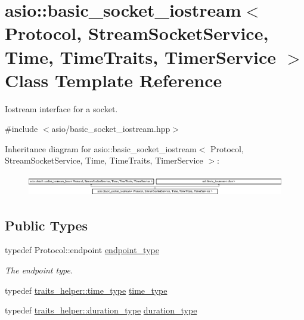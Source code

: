 \hypertarget{classasio_1_1basic__socket__iostream}{}\section{asio\+:\+:basic\+\_\+socket\+\_\+iostream$<$ Protocol, Stream\+Socket\+Service, Time, Time\+Traits, Timer\+Service $>$ Class Template Reference}
\label{classasio_1_1basic__socket__iostream}


Iostream interface for a socket.  




{\ttfamily \#include $<$asio/basic\+\_\+socket\+\_\+iostream.\+hpp$>$}

Inheritance diagram for asio\+:\+:basic\+\_\+socket\+\_\+iostream$<$ Protocol, Stream\+Socket\+Service, Time, Time\+Traits, Timer\+Service $>$\+:\begin{figure}[H]
\begin{center}
\leavevmode
\includegraphics[height=0.941176cm]{classasio_1_1basic__socket__iostream}
\end{center}
\end{figure}
\subsection*{Public Types}
\begin{DoxyCompactItemize}
\item 
typedef Protocol\+::endpoint \hyperlink{classasio_1_1basic__socket__iostream_a7c5f21f11ac0d35b00935ba750b8ed4d}{endpoint\+\_\+type}
\begin{DoxyCompactList}\small\item\em The endpoint type. \end{DoxyCompactList}\item 
typedef \hyperlink{structasio_1_1detail_1_1chrono__time__traits_a19c14f4d45a8b164d2ea4590eebc1c10}{traits\+\_\+helper\+::time\+\_\+type} \hyperlink{classasio_1_1basic__socket__iostream_a1f1cbdf5a23170d9d7b4a03f4dcf1a03}{time\+\_\+type}
\item 
typedef \hyperlink{structasio_1_1detail_1_1chrono__time__traits_a7f122a7cb603e7516bb6595016960775}{traits\+\_\+helper\+::duration\+\_\+type} \hyperlink{classasio_1_1basic__socket__iostream_af9d3e684e0709c574a1d92f7013e1b36}{duration\+\_\+type}
\end{DoxyCompactItemize}

